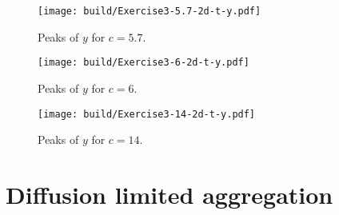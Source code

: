 \documentclass[twocolumn]{article}
\begin{document}
\begin{figure}
	\centering
  \texttt{[image: build/Exercise3-5.7-2d-t-y.pdf]}
  \caption{Peaks of $y$ for $c = 5.7$.}
  \label{fig:smallc-yt}
\end{figure}
\begin{figure}
	\centering
  \texttt{[image: build/Exercise3-6-2d-t-y.pdf]}
  \caption{Peaks of $y$ for $c = 6$.}
  \label{fig:mediumc-yt}
\end{figure}
\begin{figure}
	\centering
  \texttt{[image: build/Exercise3-14-2d-t-y.pdf]}
  \caption{Peaks of $y$ for $c = 14$.}
  \label{fig:largec-yt}
\end{figure}
\section{Diffusion limited aggregation}
\end{document}
